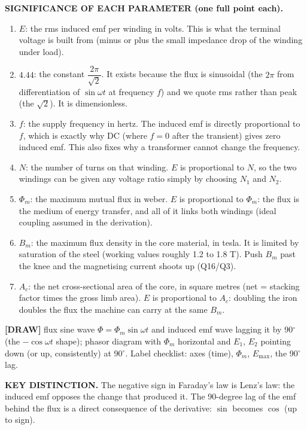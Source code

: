 \documentclass[11pt]{article}
\newcommand{\tagline}[1]{\textbf{\color{copper}#1}}
\newcommand{\keydist}[1]{\vspace{2pt}\textbf{\color{red}KEY DISTINCTION.} #1}
\newcommand{\drawline}[1]{\textbf{\color{muted}[DRAW]} #1}
\begin{document}
\tagline{SIGNIFICANCE OF EACH PARAMETER (one full point each).}
\begin{enumerate}[label=\arabic*.]
\item $E$: the rms induced emf per winding in volts. This is what the terminal voltage is built from (minus or plus the small impedance drop of the winding under load).
\item $4.44$: the constant $\dfrac{2\pi}{\sqrt{2}}$. It exists because the flux is sinusoidal (the $2\pi$ from differentiation of $\sin\omega t$ at frequency $f$) and we quote rms rather than peak (the $\sqrt{2}$). It is dimensionless.
\item $f$: the supply frequency in hertz. The induced emf is directly proportional to $f$, which is exactly why DC (where $f = 0$ after the transient) gives zero induced emf. This also fixes why a transformer cannot change the frequency.
\item $N$: the number of turns on that winding. $E$ is proportional to $N$, so the two windings can be given any voltage ratio simply by choosing $N_1$ and $N_2$.
\item $\Phi_m$: the maximum mutual flux in weber. $E$ is proportional to $\Phi_m$: the flux is the medium of energy transfer, and all of it links both windings (ideal coupling assumed in the derivation).
\item $B_m$: the maximum flux density in the core material, in tesla. It is limited by saturation of the steel (working values roughly 1.2 to 1.8 T). Push $B_m$ past the knee and the magnetising current shoots up (Q16/Q3).
\item $A_c$: the net cross-sectional area of the core, in square metres (net = stacking factor times the gross limb area). $E$ is proportional to $A_c$: doubling the iron doubles the flux the machine can carry at the same $B_m$.
\end{enumerate}

\drawline{flux sine wave $\Phi = \Phi_m\sin\omega t$ and induced emf wave lagging it by 90$^\circ$ (the $-\cos\omega t$ shape); phasor diagram with $\Phi_m$ horizontal and $E_1$, $E_2$ pointing down (or up, consistently) at 90$^\circ$. Label checklist: axes (time), $\Phi_m$, $E_{\text{max}}$, the 90$^\circ$ lag.}

\keydist{The negative sign in Faraday's law is Lenz's law: the induced emf opposes the change that produced it. The 90-degree lag of the emf behind the flux is a direct consequence of the derivative: $\sin$ becomes $\cos$ (up to sign).}
\end{document}
